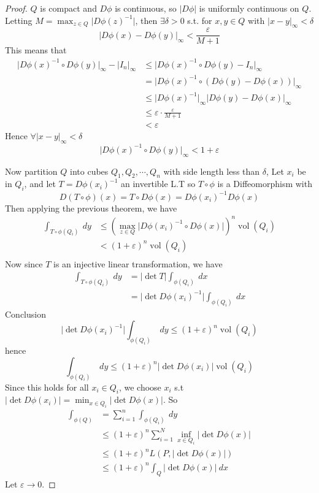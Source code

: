 \documentclass[11pt,openany]{book}
\theoremstyle{plain}
\theoremstyle{definition}
\theoremstyle{remark}
\newcommand{\vol}{\operatorname{vol}}
\newcommand{\abs}[1]{\lvert #1 \rvert}
\begin{document}
\begin{proof}
    $Q$ is compact and $D\phi$ is continuous, so $\abs{D\phi}$ is uniformly continuous 
    on $Q$. Letting $M = \max_{z \in Q} \abs{D\phi(z)^{-1}}$, then $\exists \delta > 0$ s.t. 
    for $x,y \in Q$ with $\abs{x-y}_\infty < \delta$ 
    $$\abs{D\phi(x) - D\phi(y)}_\infty < \frac{\varepsilon}{M+1}$$
    This means that 
    \begin{align*}
        \abs{D\phi(x)^{-1} \circ D\phi(y)}_\infty - \abs{I_n}_\infty &\le \abs{D\phi(x)^{-1} \circ D\phi(y) - I_n}_\infty \\
        &= \abs{D\phi(x)^{-1} \circ (D\phi(y) - D\phi(x))}_\infty \\
        &\le \abs{D\phi(x)^{-1}}_\infty \abs{D\phi(y) - D\phi(x)}_\infty \\
        &\le \varepsilon \cdot \frac{\varepsilon}{M+1} \\
        &< \varepsilon
    \end{align*}
    Hence $\forall \abs{x-y}_\infty < \delta$
    $$\abs{D\phi(x)^{-1} \circ D\phi(y)}_\infty < 1 + \varepsilon$$
    
    Now partition $Q$ into cubes $Q_1, Q_2, \cdots, Q_n$ with side length less than $\delta$, 
    Let $x_i$ be in $Q_i$, and let $T = D\phi(x_i)^{-1}$ an invertible L.T so $T \circ \phi$ is a Diffeomorphism with 
    $$D (T \circ \phi) (x) = T \circ D \phi (x) = D \phi(x_i)^{-1} D\phi(x)$$
    Then applying the previous theorem, we have 
    \begin{align*}
        \int_{T \circ \phi (Q_i)} \ dy &\le (\max_{z \in Q} \abs{D\phi(x_i)^{-1} \circ D\phi(x)})^n \vol (Q_i) \\
        &<(1+\varepsilon)^n \vol (Q_i) \\
    \end{align*}  
    Now since $T$ is an injective linear transformation, we have 
    \begin{align*}
        \int_{T \circ \phi(Q_i)} \ dy &= \abs{\det T} \int_{\phi(Q_i)} \ dx \\
        &= \abs{\det D\phi(x_i)^{-1}} \int_{\phi(Q_i)} \ dx 
    \end{align*}
    Conclusion 
    $$\abs{\det D\phi(x_i)^{-1}} \int_{\phi(Q_i)} \ dy \le (1+ \varepsilon)^n \vol (Q_i)$$
    hence 
    $$\int_{\phi(Q_i)} \ dy \le (1 + \varepsilon)^n \abs{\det D\phi(x_i)} \vol (Q_i)$$
    Since this holds for all $x_i \in Q_i$, we choose $x_i$ s.t 
    $\abs{\det D\phi(x_i)} = \min_{x \in Q_i} \abs{\det D\phi(x)}$. So 
    \begin{align*}
        \int_{\phi(Q)} &= \sum_{i=1}^n \int_{\phi(Q_i)} \ dy \\
        &\le (1+\varepsilon)^n \sum_{i=1}^N \inf_{x \in Q_i} \abs{\det D\phi(x)} \\
        &\le (1+ \varepsilon)^n L(P, \abs{\det D\phi(x)}) \\
        &\le (1+ \varepsilon)^n \int_{Q} \abs{\det D\phi(x)} \ dx 
    \end{align*}
    Let $\varepsilon \to 0$. 
\end{proof}
\end{document}
